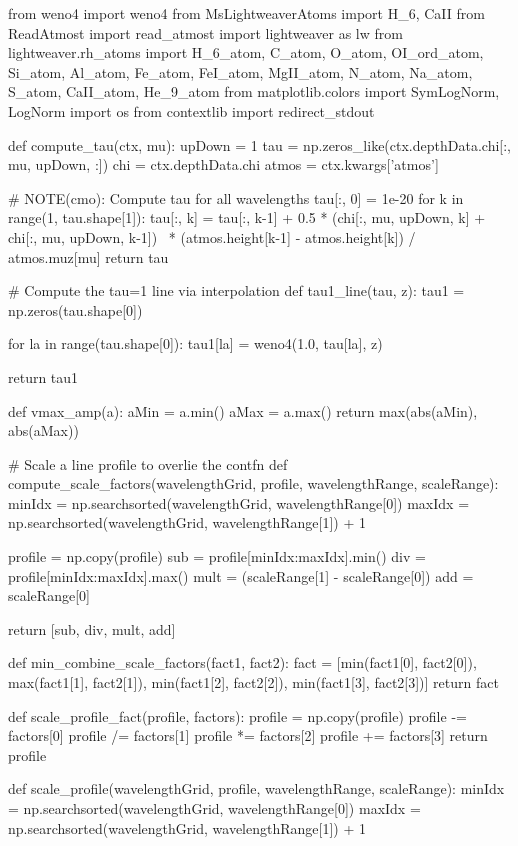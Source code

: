 \begin{pycode}[2DRT]
from weno4 import weno4
from MsLightweaverAtoms import H_6, CaII
from ReadAtmost import read_atmost
import lightweaver as lw
from lightweaver.rh_atoms import H_6_atom, C_atom, O_atom, OI_ord_atom, Si_atom, Al_atom, Fe_atom, FeI_atom, MgII_atom, N_atom, Na_atom, S_atom, CaII_atom, He_9_atom
from matplotlib.colors import SymLogNorm, LogNorm
import os
from contextlib import redirect_stdout


def compute_tau(ctx, mu):
    upDown = 1
    tau = np.zeros_like(ctx.depthData.chi[:, mu, upDown, :])
    chi = ctx.depthData.chi
    atmos = ctx.kwargs['atmos']

    # NOTE(cmo): Compute tau for all wavelengths
    tau[:, 0] = 1e-20
    for k in range(1, tau.shape[1]):
        tau[:, k] = tau[:, k-1] + 0.5 * (chi[:, mu, upDown, k] + chi[:, mu, upDown, k-1]) \
                                      * (atmos.height[k-1] - atmos.height[k]) / atmos.muz[mu]
    return tau

# Compute the tau=1 line via interpolation
def tau1_line(tau, z):
    tau1 = np.zeros(tau.shape[0])

    for la in range(tau.shape[0]):
        tau1[la] = weno4(1.0, tau[la], z)

    return tau1

def vmax_amp(a):
    aMin = a.min()
    aMax = a.max()
    return max(abs(aMin), abs(aMax))

# Scale a line profile to overlie the contfn
def compute_scale_factors(wavelengthGrid, profile, wavelengthRange, scaleRange):
    minIdx = np.searchsorted(wavelengthGrid, wavelengthRange[0])
    maxIdx = np.searchsorted(wavelengthGrid, wavelengthRange[1]) + 1

    profile = np.copy(profile)
    sub = profile[minIdx:maxIdx].min()
    div = profile[minIdx:maxIdx].max()
    mult = (scaleRange[1] - scaleRange[0])
    add = scaleRange[0]

    return [sub, div, mult, add]

def min_combine_scale_factors(fact1, fact2):
    fact = [min(fact1[0], fact2[0]),
            max(fact1[1], fact2[1]),
            min(fact1[2], fact2[2]),
            min(fact1[3], fact2[3])]
    return fact

def scale_profile_fact(profile, factors):
    profile = np.copy(profile)
    profile -= factors[0]
    profile /= factors[1]
    profile *= factors[2]
    profile += factors[3]
    return profile

def scale_profile(wavelengthGrid, profile, wavelengthRange, scaleRange):
    minIdx = np.searchsorted(wavelengthGrid, wavelengthRange[0])
    maxIdx = np.searchsorted(wavelengthGrid, wavelengthRange[1]) + 1


\end{pycode}
